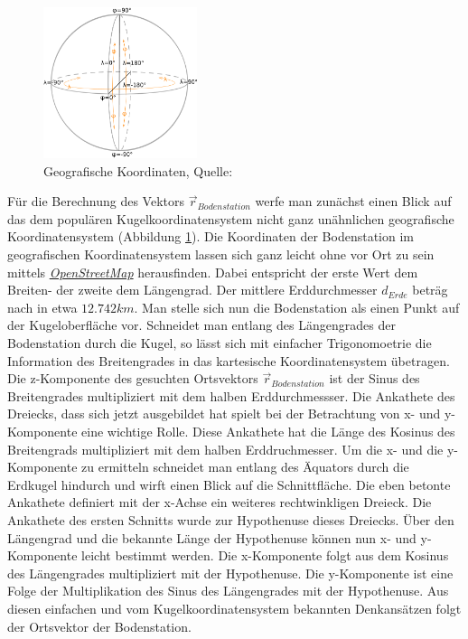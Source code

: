 \begin{figure}[h]                                                                           %
	\centering                                                                            	%
	\includegraphics[width=0.4\textwidth]{./images/geographic_coordinates.jpg}              %
	\caption[Geografische Koordinaten]{Geografische Koordinaten, Quelle: \cite{Wiki:Geo}}                        												%
	\label{fig:geo}                                                                         %
\end{figure}                                                                              	%
Für die Berechnung des Vektors \ensuremath{\vec{r}_{Bodenstation}} werfe man zunächst einen Blick auf das dem populären Kugelkoordinatensystem nicht ganz unähnlichen geografische Koordinatensystem (Abbildung \ref{fig:geo}). Die Koordinaten der Bodenstation im geografischen Koordinatensystem lassen sich ganz leicht ohne vor Ort zu sein mittels \href{http://www.openstreetmap.org/search?query=47.66530%2C9.44805#map=19/47.66530/9.44805}{\textit{OpenStreetMap}} herausfinden. Dabei entspricht der erste Wert dem Breiten- der zweite dem Längengrad. Der mittlere Erddurchmesser \ensuremath{d_{Erde}} beträg nach \cite{Wiki:Erde} in etwa \ensuremath{12.742 km}.
\newpar
Man stelle sich nun die Bodenstation als einen Punkt auf der Kugeloberfläche vor. Schneidet man entlang des Längengrades der Bodenstation durch die Kugel, so lässt sich mit einfacher Trigonomoetrie die Information des Breitengrades in das kartesische Koordinatensystem übetragen. Die z-Komponente des gesuchten Ortsvektors \ensuremath{\vec{r}_{Bodenstation}} ist der Sinus des Breitengrades multipliziert mit dem halben Erddurchmessser. Die Ankathete des Dreiecks, dass sich jetzt ausgebildet hat spielt bei der Betrachtung von x- und y-Komponente eine wichtige Rolle. Diese Ankathete hat die Länge des Kosinus des Breitengrads multipliziert mit dem halben Erddruchmesser. Um die x- und die y-Komponente zu ermitteln schneidet man entlang des Äquators durch die Erdkugel hindurch und wirft einen Blick auf die Schnittfläche. Die eben betonte Ankathete definiert mit der x-Achse ein weiteres rechtwinkligen Dreieck. Die Ankathete des ersten Schnitts wurde zur Hypothenuse dieses Dreiecks. Über den Längengrad und die bekannte Länge der Hypothenuse können nun x- und y-Komponente leicht bestimmt werden. Die x-Komponente folgt aus dem Kosinus des Längengrades multipliziert mit der Hypothenuse. Die y-Komponente ist eine Folge der Multiplikation des Sinus des Längengrades mit der Hypothenuse. Aus diesen einfachen und vom Kugelkoordinatensystem bekannten Denkansätzen folgt der Ortsvektor der Bodenstation. 
